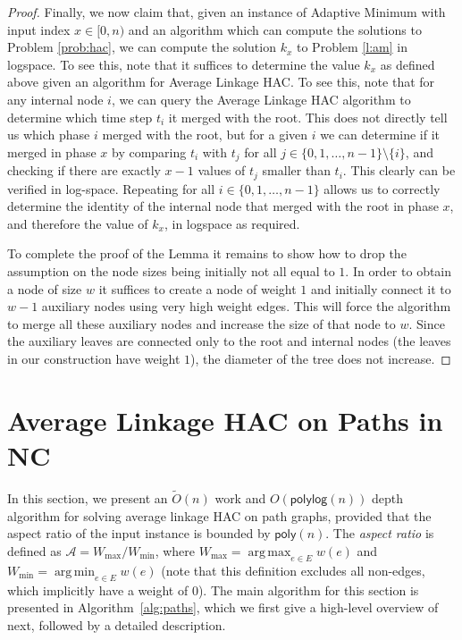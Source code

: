 \documentclass[11pt]{article}
\newcommand{\am}{\textsf{Adaptive Minimum}\xspace}
\newcommand{\hac}{\textsf{Average Linkage HAC}\xspace}
\DeclareMathOperator*{\argmax}{arg\,max}
\DeclareMathOperator*{\argmin}{arg\,min}
\newcommand{\NC}{\textsc{NC}\xspace}
\newcommand{\poly}{\ensuremath{\mathsf{poly}}}
\begin{document}
\begin{proof}
Finally, we now claim that, given an instance of \am with input index $x \in [0,n)$ and  an algorithm which can compute the solutions to Problem \ref{prob:hac}, we can compute the solution $k_x$ to Problem \ref{l:am} in logspace. To see this, note that it suffices to determine the value $k_x$ as defined above given an algorithm for \hac. To see this, note that for any internal node $i$, we can query the \hac algorithm to determine which time step $t_i$ it merged with the root. 
This does not directly tell us which phase $i$ merged with the root, but for a given $i$ we can determine if it merged in phase $x$ 
by comparing $t_i$ with $t_j$ for all $j \in \{0,1,\dots,n-1\} \setminus \{i\}$, and checking if there are exactly $x-1$ values of $t_j$ smaller than $t_i$. This clearly can be verified in log-space. 
Repeating for all $i \in  \{0,1,\dots,n-1\}$ allows us to correctly determine the identity of the internal node that merged with the root in phase $x$, and therefore the value of $k_x$, in logspace as required.

To complete the proof of the Lemma it remains to show how to drop the assumption on the node sizes being initially not all equal to $1$.
In order to obtain a node of size $w$ it suffices to create a node of weight $1$ and initially connect it to $w-1$ auxiliary nodes using very high weight edges.
This will force the algorithm to merge all these auxiliary nodes and increase the size of that node to $w$.
Since the auxiliary leaves are connected only to the root and internal nodes (the leaves in our construction have weight $1$), the diameter of the tree does not increase.
\end{proof}


\section{Average Linkage HAC on Paths in \NC}\label{sec:pathupperbound}
In this section, we present an $\tilde{O}(n)$ work and $O(\mathsf{polylog}(n))$ depth algorithm for solving average linkage HAC on path graphs, provided that the aspect ratio of the input instance is bounded by $\poly(n)$.
The {\em aspect ratio} is defined as $\mathcal{A} = W_{\max}/W_{\min}$, where $W_{\max} = \argmax_{e \in E} w(e)$ and $W_{\min} = \argmin_{e\in E} w(e)$ (note that this definition excludes all non-edges, which implicitly have a weight of 0).
The main algorithm for this section is presented in Algorithm~\ref{alg:paths}, which we first give a high-level overview of next, followed by a detailed description.
\end{document}
